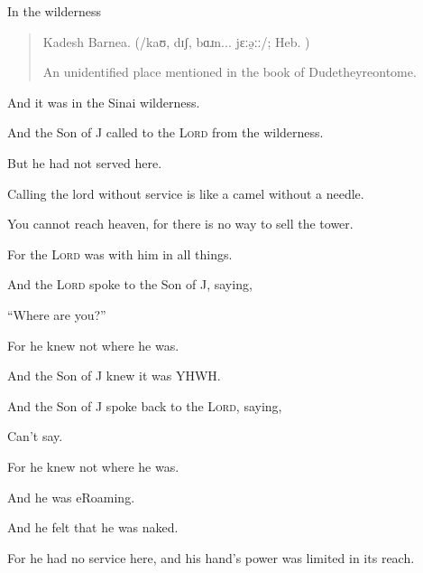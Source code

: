 
\Sentence
{ \hX{} }
{ \eX{} }
{
    \begin{center}
        {\Large {}\par}
        \vspace{0.4em}
        {\large In the wilderness\par}
    \end{center}
    \begin{quote}
        Kadesh Barnea. (/kaʊ, dɪʃ, bɑɹn... jɛːə̯ːː/; Heb. )

        An unidentified place mentioned in the book of Dudetheyreontome.
    \end{quote}
}
\Sentence
{ \hX{} }
{ \eX{} }
{
    And it was in the Sinai wilderness.
    \begin{center}
    \end{center}
    And the Son of J called to the \textsc{Lord} from the wilderness.

    But he had not served here.
}
\Sentence
{ \hX{} }
{ \eX{} }
{
Calling the lord without service is like a camel without a needle.

    You cannot reach heaven, for there is no way to sell the tower.
}

\Sentence
{ \hX{} }
{ \eX{} }
{

    For the \textsc{Lord} was with him in all things.
}

\Sentence
{ \hX{} }
{ \eX{} }
{
And the \textsc{Lord} spoke to the Son of J, saying,

    ``Where are you?''

    For he knew not where he was.
}

\Sentence
{ \hX{} }
{ \eX{} }
{
And the Son of J knew it was YHWH.

    And the Son of J spoke back to the \textsc{Lord}, saying,

    Can't say.

    For he knew not where he was.
}

\Sentence
{ \hX{} }
{ \eX{} }
{
And he was eRoaming.

    And he felt that he was naked.

    For he had no service here, and his hand's power was limited in its reach.
}

